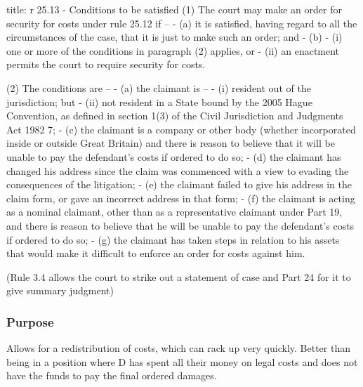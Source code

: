 \documentclass[
]{article}
\newenvironment{Shaded}{}{}
\newcommand{\NormalTok}[1]{#1}
\begin{document}
\begin{Shaded}
\begin{Highlighting}[]
\NormalTok{title: r 25.13 {-} Conditions to be satisfied}
\NormalTok{(1) The court may make an order for security for costs under rule 25.12 if –}
\NormalTok{{-} (a) it is satisfied, having regard to all the circumstances of the case, that it is just to make such an order; and}
\NormalTok{{-} (b)}
\NormalTok{    {-} (i) one or more of the conditions in paragraph (2) applies, or}
\NormalTok{    {-} (ii) an enactment permits the court to require security for costs.}

\NormalTok{(2) The conditions are –}
\NormalTok{{-} (a) the claimant is –}
\NormalTok{    {-} (i) resident out of the jurisdiction; but}
\NormalTok{    {-} (ii) not resident in a State bound by the 2005 Hague Convention, as defined in section 1(3) of the Civil Jurisdiction and Judgments Act 1982 7;}
\NormalTok{{-} (c) the claimant is a company or other body (whether incorporated inside or outside Great Britain) and there is reason to believe that it will be unable to pay the defendant’s costs if ordered to do so;}
\NormalTok{{-} (d) the claimant has changed his address since the claim was commenced with a view to evading the consequences of the litigation;}
\NormalTok{{-} (e) the claimant failed to give his address in the claim form, or gave an incorrect address in that form;}
\NormalTok{{-} (f) the claimant is acting as a nominal claimant, other than as a representative claimant under Part 19, and there is reason to believe that he will be unable to pay the defendant’s costs if ordered to do so;}
\NormalTok{{-} (g) the claimant has taken steps in relation to his assets that would make it difficult to enforce an order for costs against him.}

\NormalTok{(Rule 3.4 allows the court to strike out a statement of case and Part 24 for it to give summary judgment)}
\end{Highlighting}
\end{Shaded}

\hypertarget{purpose}{%
\subsubsection{Purpose}\label{purpose}}

Allows for a redistribution of costs, which can rack up very quickly.
Better than being in a position where D has spent all their money on
legal costs and does not have the funds to pay the final ordered
damages.
\end{document}

